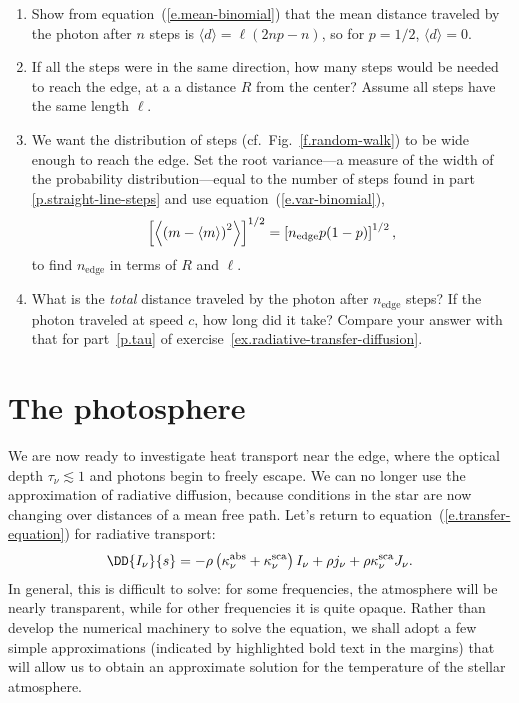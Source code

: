 \begin{exercisebox}
\label{ex.random-walk-diffusion}
\begin{enumerate}
\item
Show from equation~(\ref{e.mean-binomial}) that the mean distance traveled by the photon after $n$ steps is $\langle d\rangle = \ell(2np-n)$, so for $p=1/2$, $\langle d\rangle = 0$.

\item\label{p.straight-line-steps}
If all the steps were in the same direction, how many steps would be needed to reach the edge, at a a distance $R$ from the center? Assume all steps have the same length $\ell$.

\item
We want the distribution of steps (cf.\ Fig.~\ref{f.random-walk}) to be wide enough to reach the edge. Set the root variance---a measure of the width of the probability distribution---equal to the number of steps found in part \ref{p.straight-line-steps} and use equation~(\ref{e.var-binomial}),
	\[
		\left[\left\langle\left(m-\left\langle m\right\rangle\right)^{2}\right\rangle\right]^{1/2} = 
			\left[n_{\mathrm{edge}}p(1-p)\right]^{1/2},
	\]
	to find $n_{\mathrm{edge}}$ in terms of $R$ and $\ell$.

\item
What is the \emph{total} distance traveled by the photon after $n_{\mathrm{edge}}$ steps? If the photon traveled at speed $c$, how long did it take? Compare your answer with that for part~\ref{p.tau} of exercise~\ref{ex.radiative-transfer-diffusion}.

\end{enumerate}
\end{exercisebox}

\section{The photosphere}

We are now ready to investigate heat transport near the edge, where the optical depth $\tau_{\nu} \lesssim 1$ and photons begin to freely escape. We can no longer use the approximation of radiative diffusion, because conditions in the star are now changing over distances of a mean free path. Let's return to equation~(\ref{e.transfer-equation}) for radiative transport:
\[
	\DD{I_{\nu}}{s} = -\rho\left(\kapabs + \kapscat\right) I_{\nu} + \rho j_{\nu} + \rho\kapscat J_{\nu}.
\]
In general, this is difficult to solve: for some frequencies, the atmosphere will be nearly transparent, while for other frequencies it is quite opaque. Rather than develop the numerical machinery to solve the equation, we shall adopt a few simple approximations (indicated by highlighted bold text in the margins) that will allow us to obtain an approximate solution for the temperature of the stellar atmosphere.

